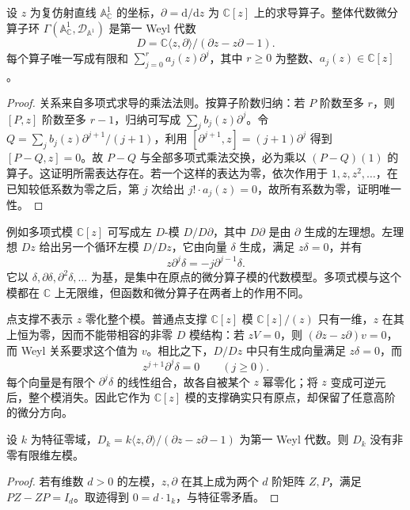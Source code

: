 \begin{proposition}\label{b5:prop:affine-line-differential-operators}
	设 \(z\) 为复仿射直线 \(\mathbb A^1_{\mathbb C}\) 的坐标，\(\partial=\mathrm{d}/\mathrm{d}z\) 为 \(\mathbb C[z]\) 上的求导算子。整体代数微分算子环 \(\Gamma(\mathbb A^1_{\mathbb C},\mathcal D_{\mathbb A^1})\) 是第一 Weyl 代数
	\[
		D=\mathbb C\langle z,\partial\rangle/(\partial z-z\partial-1).
	\]
	每个算子唯一写成有限和 \(\sum_{j=0}^r a_j(z)\partial^j\)，其中 \(r\ge0\) 为整数、\(a_j(z)\in\mathbb C[z]\)。
\end{proposition}
\begin{proof}
	关系来自多项式求导的乘法法则。按算子阶数归纳：若 \(P\) 阶数至多 \(r\)，则 \([P,z]\) 阶数至多 \(r-1\)，归纳可写成 \(\sum_j b_j(z)\partial^j\)。令 \(Q=\sum_j b_j(z)\partial^{j+1}/(j+1)\)，利用 \([\partial^{j+1},z]=(j+1)\partial^j\) 得到 \([P-Q,z]=0\)。故 \(P-Q\) 与全部多项式乘法交换，必为乘以 \((P-Q)(1)\) 的算子。这证明所需表达存在。若一个这样的表达为零，依次作用于 \(1,z,z^2,\ldots\)，在已知较低系数为零之后，第 \(j\) 次给出 \(j!\cdot a_j(z)=0\)，故所有系数为零，证明唯一性。
\end{proof}

例如多项式模 \(\mathbb C[z]\) 可写成左 \(D\)-模 \(D/D\partial\)，其中 \(D\partial\) 是由 \(\partial\) 生成的左理想。左理想 \(Dz\) 给出另一个循环左模 \(D/Dz\)，它由向量 \(\delta\) 生成，满足 \(z\delta=0\)，并有
\[
	z\partial^j\delta=-j\partial^{j-1}\delta.
\]
它以 \(\delta,\partial\delta,\partial^2\delta,\ldots\) 为基，是集中在原点的微分算子模的代数模型。多项式模与这个模都在 \(\mathbb C\) 上无限维，但函数和微分算子在两者上的作用不同。

\ProseParagraphBreak
点支撑不表示 \(z\) 零化整个模。普通点支撑 \(\mathbb C[z]\) 模 \(\mathbb C[z]/(z)\) 只有一维，\(z\) 在其上恒为零，因而不能带相容的非零 \(D\) 模结构：若 \(zV=0\)，则 \((\partial z-z\partial)v=0\)，而 Weyl 关系要求这个值为 \(v\)。相比之下，\(D/Dz\) 中只有生成向量满足 \(z\delta=0\)，而
\[
	z^{j+1}\partial^j\delta=0\qquad(j\ge0).
\]
每个向量是有限个 \(\partial^j\delta\) 的线性组合，故各自被某个 \(z\) 幂零化；将 \(z\) 变成可逆元后，整个模消失。因此它作为 \(\mathbb C[z]\) 模的支撑确实只有原点，却保留了任意高阶的微分方向。

\begin{proposition}\label{b5:prop:weyl-no-finite-dimensional-modules}
	设 \(k\) 为特征零域，\(D_k=k\langle z,\partial\rangle/(\partial z-z\partial-1)\) 为第一 Weyl 代数。则 \(D_k\) 没有非零有限维左模。
\end{proposition}
\begin{proof}
	若有维数 \(d>0\) 的左模，\(z,\partial\) 在其上成为两个 \(d\) 阶矩阵 \(Z,P\)，满足 \(PZ-ZP=I_d\)。取迹得到 \(0=d\cdot1_k\)，与特征零矛盾。
\end{proof}

